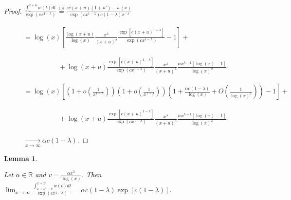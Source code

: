 \documentclass[11pt]{amsart}
\newtheorem{lemma}[theorem]{Lemma}
\numberwithin{equation}{section}
\newcommand{\R}{\mathbb{R}}
\newcommand{\diint}{\displaystyle \int}
\newcommand{\dilim}{\displaystyle \lim}
\newcommand{\difrac}{\displaystyle \frac}
\begin{document}
\begin{proof} $\difrac{\diint_{x}^{x + u} w(t) dt}{\exp(cx^{1 - \lambda})} \overset{\text{LH}}{=} \difrac{w(x + u)(1 + u') - w(x)}{\exp(cx^{1 - \lambda})c(1 - \lambda)x^{-\lambda}}$ \\ \null \\ \null $\qquad \ \ \ \  = \log(x)\left[\difrac{\log(x + u)}{\log(x)} \difrac{x^{\lambda}}{(x + u)^{\lambda}} \difrac{\exp[c(x + u)^{1 - \lambda}]}{\exp(cx^{1 - \lambda})} - 1\right] +$ \\ \null \\ \null $\qquad \qquad \qquad \qquad + \log(x + u) \difrac{\exp[c(x + u)^{1 - \lambda}]}{\exp(cx^{1 - \lambda})} \difrac{x^{\lambda}}{(x + u)^{\lambda}} \difrac{\alpha x^{\lambda - 1}[\log(x) - 1]}{\log(x)^2}$ \\ \null \\ \null $\qquad \ \ \ \  = \log(x)\left[\left(1 + o\left(\difrac{1}{x^{1 - \lambda}}\right)\right) \left(1 + o\left(\difrac{1}{x^{1 - \lambda}}\right)\right) \left(1 + \difrac{\alpha c(1 - \lambda)}{\log(x)} +  O\left(\difrac{1}{\log(x)^2}\right)\right) - 1\right] +$ \\ \null \\ \null $\qquad \qquad \qquad \qquad + \log(x + u) \difrac{\exp[c(x + u)^{1 - \lambda}]}{\exp(cx^{1 - \lambda})} \difrac{x^{\lambda}}{(x + u)^{\lambda}} \difrac{\alpha x^{\lambda - 1}[\log(x) - 1]}{\log(x)^2}$ \\ \null \\ \null $\qquad \ \ \ \ \xrightarrow[x \to \infty]{} \alpha c(1 - \lambda).$ \end{proof}

\begin{lemma} \label{integralliminf}

Let $\alpha \in \R$ and $v = \difrac{\alpha x^{\lambda}}{\log(x)}$. Then $\dilim_{x \to \infty} \difrac{\diint_{x + x^{\lambda} - v}^{x + x^{\lambda}} w(t) dt}{\exp(cx^{1 - \lambda})} = \alpha c(1 - \lambda)\exp[c(1 - \lambda)]$.

\end{lemma}
\end{document}
